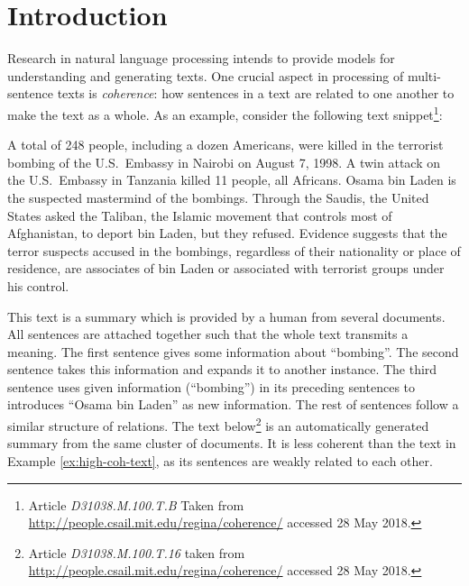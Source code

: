 
\chapter{Introduction}
\label{ch:intro}

Research in natural language processing intends to provide models for understanding and generating texts.   
One crucial aspect in processing of multi-sentence texts is \emph{coherence}: how sentences in a text are related to one another to make the text as a whole. 
As an example, consider the following text snippet\footnote{Article \emph{D31038.M.100.T.B} Taken from \url{http://people.csail.mit.edu/regina/coherence/} accessed 28 May 2018. 
}:

\begin{examples}
\label{ex:high-coh-text}
A total of 248 people, including a dozen Americans, were killed in the terrorist bombing of the U.S.\ Embassy in Nairobi on August 7, 1998. 
A twin attack on the U.S.\ Embassy in Tanzania killed 11 people, all Africans. 
Osama bin Laden is the suspected mastermind of the bombings. 
Through the Saudis, the United States asked the Taliban, the Islamic movement that controls most of Afghanistan, to deport bin Laden, but they refused. 
Evidence suggests that the terror suspects accused in the bombings, regardless of their nationality or place of residence, are associates of bin Laden or associated with terrorist groups under his control.
\end{examples}

This text is a summary which is provided by a human from several documents. 
All sentences are attached together such that the whole text transmits a meaning. 
The first sentence gives some information about ``bombing''. 
The second sentence takes this information and expands it to another instance. 
The third sentence uses given information (``bombing'') in its preceding sentences to introduces ``Osama bin Laden'' as new information. 
The rest of sentences follow a similar structure of relations.  
The text below\footnote{Article \emph{D31038.M.100.T.16} taken from 
\url{http://people.csail.mit.edu/regina/coherence/}
accessed 28 May 2018.} is an automatically generated summary from the same cluster of documents. 
It is less coherent than the text in Example \ref{ex:high-coh-text}, as its sentences are weakly related to each other. 

